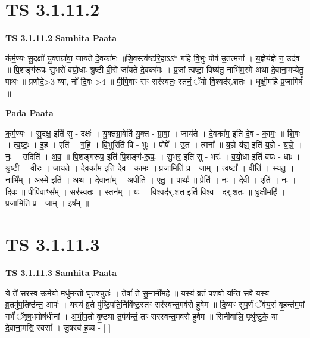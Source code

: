 \documentclass[17pt]{extarticle}
\begin{document}

\section{ TS 3.1.11.2 }

\textbf{TS 3.1.11.2 } \newline
\textbf{Samhita Paata} \newline

क॑र्म॒ण्यः॑ सु॒दक्षो॑ यु॒क्तग्रा॑वा॒ जाय॑ते दे॒वका॑मः ॥शि॒वस्त्व॑ष्टरि॒हाऽऽ* ग॑हि वि॒भुः पोष॑ उ॒तत्मना᳚ । य॒ज्ञेय॑ज्ञे न॒ उद॑व ॥ पि॒शङ्ग॑रूपः सु॒भरो॑ वयो॒धाः श्रु॒ष्टी वी॒रो जा॑यते दे॒वका॑मः । प्र॒जां त्वष्टा॒ विष्य॑तु॒ नाभि॑म॒स्मे अथा॑ दे॒वाना॒मप्ये॑तु॒ पाथः॑ ॥ प्रणो॑दे॒>3 व्या, नो॑ दि॒वः >4 ॥ पी॒पि॒वाꣳ सꣳ॒॒ सर॑स्वतः॒ स्तनं॒ ॅयो वि॒श्वद॑र्.शतः । धुक्षी॒महि॑ प्र॒जामिषं᳚ ॥ \newline

\textbf{Pada Paata} \newline

क॒र्म॒ण्यः॑ । सु॒दक्ष॒ इति॑ सु - दक्षः॑ । यु॒क्तग्रा॒वेति॑ यु॒क्त - ग्रा॒वा॒ । जाय॑ते । दे॒वका॑म॒ इति॑ दे॒व - का॒मः॒ ॥ शि॒वः । त्व॒ष्टः॒ । इ॒ह । एति॑ । ग॒हि॒ । वि॒भुरिति॑ वि - भुः । पोषे᳚ । उ॒त । त्मना᳚ ॥ य॒ज्ञे य॑ज्ञ्॒ इति॑ य॒ज्ञे - य॒ज्ञे॒ । नः॒ । उदिति॑ । अ॒व॒ ॥ पि॒शङ्ग॑रूप॒ इति॑ पि॒शङ्ग॑-रू॒पः॒ । सु॒भर॒ इति॑ सु - भरः॑ । व॒यो॒धा इति॑ वयः - धाः । श्रु॒ष्टी । वी॒रः । जा॒य॒ते॒ । दे॒वका॑म॒ इति॑ दे॒व - का॒मः॒ ॥ प्र॒जामिति॑ प्र - जाम् । त्वष्टा᳚ । वीति॑ । स्य॒तु॒ । नाभि᳚म् । अ॒स्मे इति॑ । अथ॑ । दे॒वाना᳚म् । अपीति॑ । ए॒तु॒ । पाथः॑ ॥ प्रेति॑ । नः॒ । दे॒वी । एति॑ । नः॒ । दि॒वः ॥ पी॒पि॒वाꣳस᳚म् । सर॑स्वतः । स्तन᳚म् । यः । वि॒श्वद॑र्.शत॒ इति॑ वि॒श्व - द॒र्॒.श॒तः॒ ॥ धु॒क्षी॒महि॑ । प्र॒जामिति॑ प्र - जाम् । इष᳚म् ॥  \newline





\section{ TS 3.1.11.3 }

\textbf{TS 3.1.11.3 } \newline
\textbf{Samhita Paata} \newline

ये ते॑ सरस्व ऊ॒र्मयो॒ मधु॑मन्तो घृत॒श्चुतः॑ । तेषां᳚ ते सु॒म्नमी॑महे ॥ यस्य॑ व्र॒तं प॒शवो॒ यन्ति॒ सर्वे॒ यस्य॑ व्र॒तमु॑प॒तिष्ठ॑न्त॒ आपः॑ । यस्य॑ व्र॒ते पु॑ष्टि॒पति॒र्निवि॑ष्ट॒स्तꣳ सर॑स्वन्त॒मव॑से हुवेम ॥ दि॒व्यꣳ सु॑प॒र्णं ॅव॑य॒सं बृ॒हन्त॑म॒पां गर्भं॑ ॅवृष॒भमोष॑धीनां । अ॒भी॒प॒तो वृ॒ष्ट्या त॒र्पय॑न्तं॒ तꣳ सर॑स्वन्त॒मव॑से हुवेम ॥ सिनी॑वालि॒ पृथु॑ष्टुके॒ या दे॒वाना॒मसि॒ स्वसा᳚ । जु॒षस्व॑ ह॒व्य - [  ] \newline
\end{document}
